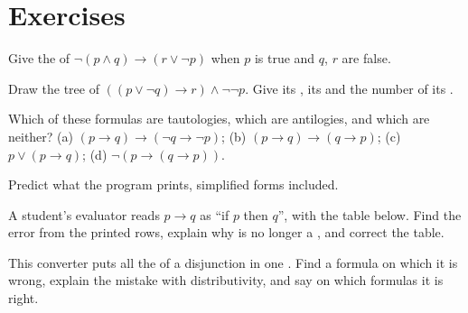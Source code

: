 \section{Exercises}\label{sec:b1:propositional-logic:exercises}

\begin{exercise}[$\star$]\label{exo:b1:propositional-logic:1}
Give the  of $\neg(p \wedge q) \rightarrow (r \vee \neg p)$ when $p$ is true and $q$, $r$ are false.
\end{exercise}

\begin{exercise}[$\star$]\label{exo:b1:propositional-logic:2}
Draw the tree of $((p \vee \neg q) \rightarrow r) \wedge \neg\neg p$. Give its , its  and the number of its
.
\end{exercise}

\begin{exercise}[$\star$]\label{exo:b1:propositional-logic:3}
Which of these formulas are tautologies, which are antilogies, and which are neither?
(a) $(p \rightarrow q) \rightarrow (\neg q \rightarrow \neg p)$; (b) $(p \rightarrow q) \rightarrow (q \rightarrow p)$;
(c) $p \vee (p \rightarrow q)$; (d) $\neg(p \rightarrow (q \rightarrow p))$.
\end{exercise}

\begin{exercise}[$\star$]\label{exo:b1:propositional-logic:4}
Predict what the program prints, simplified forms included.
\end{exercise}

\begin{exercise}[$\star\star$]\label{exo:b1:propositional-logic:5}
A student's evaluator reads $p \rightarrow q$ as ``if $p$ then $q$'', with the table below. Find the error from the
printed rows, explain why  is no longer a , and correct the table.
\end{exercise}

\begin{exercise}[$\star\star$]\label{exo:b1:propositional-logic:6}
This converter puts all the  of a disjunction in one . Find a formula on which it is wrong, explain the
mistake with distributivity, and say on which formulas it is right.
\end{exercise}

